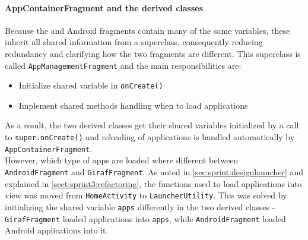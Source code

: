 %
% 

\paragraph{AppContainerFragment and the derived classes}

Because the \giraf and Android fragments contain many of the same variables, these inherit all shared information from a superclass, consequently reducing redundancy and clarifying how the two fragments are different.
This superclass is called \lstinline!AppManagementFragment! and the main responsibilities are:

\begin{itemize}
\item Initialize shared variable in \lstinline!onCreate()!
\item Implement shared methods handling when to load applications
\end{itemize}

As a result, the two derived classes get their shared variables initialized by a call to \lstinline!super.onCreate()! and reloading of applications is handled automatically by \lstinline!AppContainerFragment!. \\

However, which type of apps are loaded where different between \lstinline!AndroidFragment! and \lstinline!GirafFragment!.
As noted in \cref{sec:sprint:designlauncher} and explained in \cref{sect:sprint3:refactoring}, the functions used to load applications into view was moved from \lstinline!HomeActivity! to \lstinline!LauncherUtility!.
This was solved by initializing the shared variable \lstinline!apps! differently in the two derived classes -
\lstinline!GirafFragment! loaded \giraf applications into \lstinline!apps!, while \lstinline!AndroidFragment! loaded Android applications into it.

